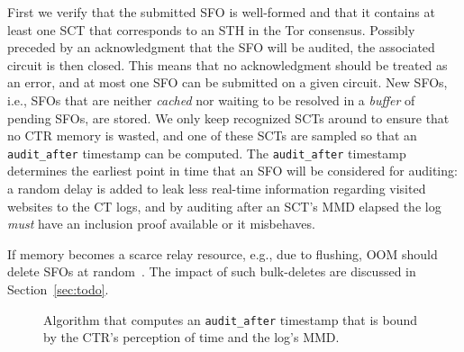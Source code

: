 First we verify that the submitted SFO is well-formed and that it contains at
least one SCT that corresponds to an STH in the Tor consensus.
Possibly preceded by an acknowledgment that the SFO will be audited, the
associated circuit is then closed.  This means that no acknowledgment should be
treated as an error, and at most one SFO can be submitted on a given circuit.
New SFOs, i.e., SFOs that are neither \emph{cached} nor waiting to be resolved
in a \emph{buffer} of pending SFOs, are stored.  We only keep recognized
SCTs around to ensure that no CTR memory is wasted, and one of these SCTs are
sampled so that an \texttt{audit\_after} timestamp can be computed.  The
\texttt{audit\_after} timestamp determines the earliest point in time that an
SFO will be considered for auditing:
	a random delay is added to leak less real-time information regarding visited
		websites to the CT logs, and
	by auditing after an SCT's MMD elapsed the log \emph{must} have an
		inclusion proof available or it misbehaves.

If memory becomes a scarce relay resource, e.g., due to flushing, OOM
should delete SFOs at random~\cite{nordberg}.  The impact of such bulk-deletes
are discussed in Section~\ref{sec:todo}.

\begin{figure}
	\centering
	\caption{%
		Algorithm that computes an \texttt{audit\_after} timestamp that is
		bound by the CTR's perception of time and the log's MMD.
	}
	\label{fig:audit-after}
\end{figure}


